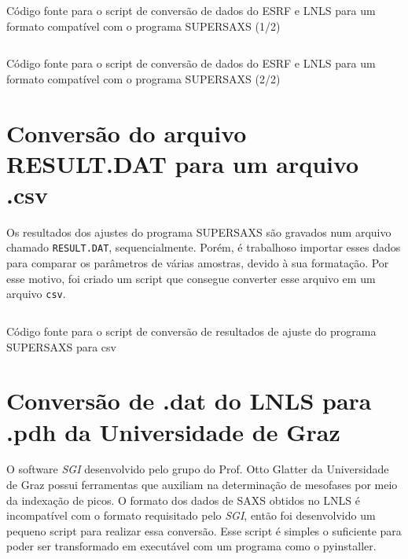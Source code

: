 \begin{apendicesenv}
\begin{listing}[h]
	\inputminted{python}{./python/converting_files1.py}
	\caption{Código fonte para o script de conversão de dados do ESRF e LNLS para um formato compatível com o programa SUPERSAXS (1/2)}  
	\label{lst:conversao_supersaxs1}
\end{listing}

\begin{listing}[h]
	\inputminted{python}{./python/converting_files2.py}
	\caption{Código fonte para o script de conversão de dados do ESRF e LNLS para um formato compatível com o programa SUPERSAXS (2/2)}  
	\label{lst:conversao_supersaxs2}
\end{listing}

\FloatBarrier

\section{Conversão do arquivo RESULT.DAT para um arquivo .csv}

Os resultados dos ajustes do programa SUPERSAXS são gravados num arquivo chamado \texttt{RESULT.DAT}, sequencialmente. Porém, é trabalhoso importar esses dados para comparar os parâmetros de várias amostras, devido à sua formatação. Por esse motivo, foi criado um script que consegue converter esse arquivo em um arquivo \texttt{csv}.

\begin{listing}[h]
	\inputminted{python}{./python/converting_results.py}
	\caption{Código fonte para o script de conversão de resultados de ajuste do programa SUPERSAXS para csv}  
	\label{lst:conversao_resultados}
\end{listing}

\FloatBarrier

\section{Conversão de .dat do LNLS para .pdh da Universidade de Graz}

O software \emph{SGI} desenvolvido pelo grupo do Prof. Otto Glatter da Universidade de Graz possui ferramentas que auxiliam na determinação de mesofases por meio da indexação de picos. O formato dos dados de SAXS obtidos no LNLS é incompatível com o formato requisitado pelo \emph{SGI}, então foi desenvolvido um pequeno script para realizar essa conversão. Esse script é simples o suficiente para poder ser transformado em executável com um programa como o pyinstaller.


\end{apendicesenv}
